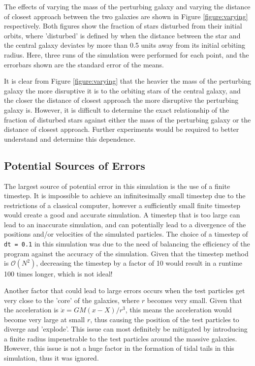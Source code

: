 \documentclass[twoside,twocolumn]{article}
\begin{document}
        
        The effects of varying the mass of the perturbing galaxy and varying the distance of closest approach between the two galaxies are shown in Figure \ref{figure:varying} respectively. Both figures show the fraction of stars disturbed from their initial orbits, where 'disturbed' is defined by when the distance between the star and the central galaxy deviates by more than 0.5 units away from its initial orbiting radius. Here, three runs of the simulation were performed for each point, and the errorbars shown are the standard error of the means. 

        It is clear from Figure \ref{figure:varying} that the heavier the mass of the perturbing galaxy the more disruptive it is to the orbiting stars of the central galaxy, and the closer the distance of closest approach the more disruptive the perturbing galaxy is. However, it is difficult to determine the exact relationship of the fraction of disturbed stars against either the mass of the perturbing galaxy or the distance of closest approach. Further experiments would be required to better understand and determine this dependence.
    
    \subsection{Potential Sources of Errors}
        
        The largest source of potential error in this simulation is the use of a finite timestep. It is impossible to achieve an infinitesimally small timestep due to the restrictions of a classical computer, however a sufficiently small finite timestep would create a good and accurate simulation. A timestep that is too large can lead to an inaccurate simulation, and can potentially lead to a divergence of the positions and/or velocities of the simulated particles. The choice of a timestep of \texttt{dt = 0.1} in this simulation was due to the need of balancing the efficiency of the program against the accuracy of the simulation. Given that the timestep method is $\mathcal{O}(N^2)$, decreasing the timestep by a factor of 10 would result in a runtime 100 times longer, which is not ideal!

        Another factor that could lead to large errors occurs when the test particles get very close to the 'core' of the galaxies, where $r$ becomes very small. Given that the acceleration is $\ddot{x} = GM(x - X) / r^3$, this means the acceleration would become very large at small $r$, thus causing the position of the test particles to diverge and 'explode'. This issue can most definitely be mitigated by introducing a finite radius impenetrable to the test particles around the massive galaxies. However, this issue is not a huge factor in the formation of tidal tails in this simulation, thus it was ignored.
\end{document}
